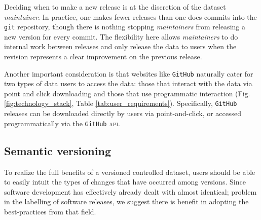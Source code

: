 \documentclass[english]{article}
\begin{document}
Deciding when to make a new release is at the discretion of the dataset \emph{maintainer}. In practice, one makes fewer releases than one does commits into the \texttt{git} repository, though there is nothing stopping \emph{maintainers} from releasing a new version for every commit. The flexibility here allows \emph{maintainers} to do internal work between releases and only release the data to users when the revision represents a clear improvement on the previous release.

Another important consideration is that websites like \texttt{GitHub} naturally cater for two types of data users to access the data: those that interact with the data via point and click downloading and those that use programmatic interaction (Fig. \ref{fig:technology_stack}, Table \ref{tab:user_requirements}). Specifically, \texttt{GitHub} releases can be downloaded directly by users via point-and-click, or accessed programmatically via the \texttt{GitHub} \textsc{api}.

\subsection*{Semantic versioning}

To realize the full benefits of a versioned controlled dataset, users should be able to easily intuit the types of changes that have occurred among versions. Since software development has effectively already dealt with almost identical; problem in the labelling of software releases, we suggest there is benefit in adopting the best-practices from that field.
\end{document}
